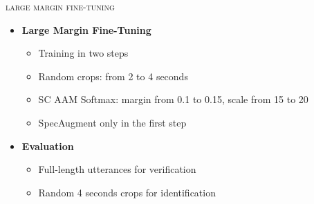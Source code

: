 \documentclass[10pt,aspectratio=1610,professionalfont]{beamer}
\begin{document}
\begin{frame}{\textsc{large margin fine-tuning}}
\center
    \begin{itemize}
        \item \textbf{Large Margin Fine-Tuning} 
        \begin{itemize}
	     \item Training in two steps
            \item Random crops: from 2 to 4 seconds
		\item SC AAM Softmax: margin from 0.1 to 0.15, scale from 15 to 20
		\item SpecAugment only in the first step
        \end{itemize} 
        \item \textbf{Evaluation}
	 \begin{itemize}
            \item Full-length utterances for verification
		\item Random 4 seconds crops for identification
        \end{itemize}
    \end{itemize}
\end{frame}
\end{document}
